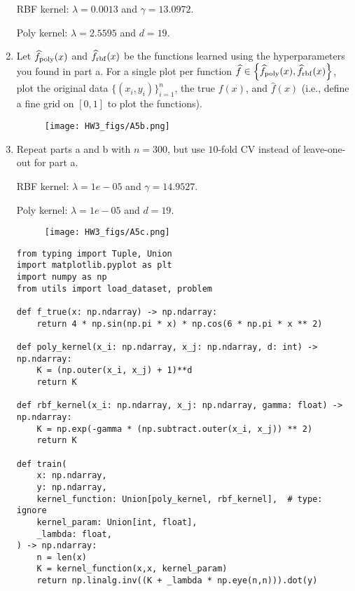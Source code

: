 \documentclass{article}
\begin{document}
\begin{aprob}
\begin{enumerate}
        RBF kernel: $\lambda = 0.0013$ and $\gamma = 13.0972$. 
        
        Poly kernel: $\lambda = 2.5595$ and $d = 19$.
        
        \item {} Let $\widehat{f}_{\rm poly}(x)$ and $\widehat{f}_{\rm rbf}(x)$ be the functions learned using the hyperparameters you found in part a.
        For a single plot per function $\widehat{f} \in \left\lbrace \widehat{f}_{\rm poly}(x), \widehat{f}_{\rm rbf}(x) \right\rbrace$, plot the original data $\{(x_i,y_i)\}_{i=1}^n$, the true $f(x)$, and $\widehat{f}(x)$ (i.e., define a fine grid on $[0,1]$ to plot the functions).
        \begin{figure}[htp] 
        \centering
        \vspace*{-0.1in}
        \texttt{[image: HW3\_figs/A5b.png]}
        \label{figs:A5b.png}
        \end{figure}
      
        \item {} Repeat parts a and b with $n=300$, but use $10$-fold CV instead of leave-one-out for part a.

        RBF kernel: $\lambda = 1e-05$ and $\gamma = 14.9527$. 
        
        Poly kernel: $\lambda = 1e-05$ and $d = 19$.
        
        \begin{figure}[htp] 
        \centering
        \vspace*{-0.1in}
        \texttt{[image: HW3\_figs/A5c.png]}
        \label{figs:A5c.png}
        \end{figure}
        
        \begin{lstlisting}
from typing import Tuple, Union
import matplotlib.pyplot as plt
import numpy as np
from utils import load_dataset, problem

def f_true(x: np.ndarray) -> np.ndarray:
    return 4 * np.sin(np.pi * x) * np.cos(6 * np.pi * x ** 2)

def poly_kernel(x_i: np.ndarray, x_j: np.ndarray, d: int) -> np.ndarray:
    K = (np.outer(x_i, x_j) + 1)**d
    return K

def rbf_kernel(x_i: np.ndarray, x_j: np.ndarray, gamma: float) -> np.ndarray:
    K = np.exp(-gamma * (np.subtract.outer(x_i, x_j)) ** 2)
    return K

def train(
    x: np.ndarray,
    y: np.ndarray,
    kernel_function: Union[poly_kernel, rbf_kernel],  # type: ignore
    kernel_param: Union[int, float],
    _lambda: float,
) -> np.ndarray:
    n = len(x)
    K = kernel_function(x,x, kernel_param)
    return np.linalg.inv((K + _lambda * np.eye(n,n))).dot(y)


\end{lstlisting}
\end{enumerate}
\end{aprob}
\end{document}
